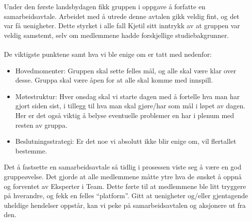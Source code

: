 Under den første landsbydagen fikk gruppen i oppgave å forfatte en
samarbeidsavtale. Arbeidet med å utrede denne avtalen gikk veldig fint,
og det var få uenigheter. Dette styrket i alle fall Kjetil sitt inntrykk
av at gruppen var veldig samstemt, selv om medlemmene hadde forskjellige
studiebakgrunner.\\
\\
 De viktigste punktene samt hva vi ble enige om er tatt
med nedenfor:
\begin{itemize}
	\item Hovedmomenter: Gruppen skal sette felles mål, og alle skal
	være klar over desse.  Gruppa skal være åpen for at alle skal komme med
	innspill.
	\item Møtestruktur: Hver onsdag skal vi starte dagen med å fortelle
	hva man har gjort siden sist, i tillegg til hva man skal gjøre/har som
	mål i løpet av dagen. Her er det også viktig å belyse eventuelle
	problemer en har i plenum med resten av gruppa.
	\item Beslutningsstrategi: Er det noe vi absolutt ikke blir enige
	om, vil flertallet bestemme.
\end{itemize}
Det å fastsette en samarbeidsavtale så tidlig i prosessen viste seg å
være en god gruppeøvelse. Det gjorde at alle medlemmene måtte ytre hva
de ønsket å oppnå og forventet av Eksperter i Team. Dette førte til at
medlemmene ble litt tryggere på hverandre, og fekk en felles
``platform''. Gitt at uenigheter og/eller gjentagende uheldige hendelser
oppstår, kan vi peke på samarbeidsavtalen og aksjonere ut fra den.
